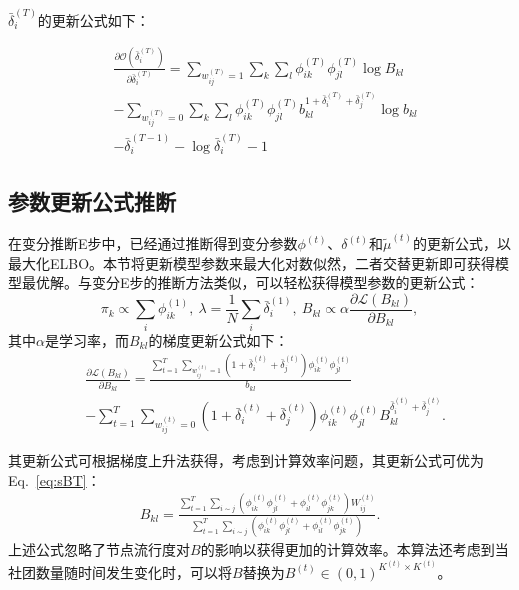 $\bar{\delta}_i^{(T)}$的更新公式如下：



\begin{equation}
\begin{split}
& \frac{\partial \mathscr{O}(\bar{\delta}_i^{(T)})}{\partial \bar{\delta}_i^{(T)}}  = \sum_{w_{ij}^{(T)}=1} \sum_k \sum_l \phi_{ik}^{(T)}\phi_{jl}^{(T)} \log B_{kl} \\
& -\sum_{w_{ij}^{(T)}=0} \sum_k \sum_l \phi_{ik}^{(T)}\phi_{jl}^{(T)}  b_{kl}^{1+\bar{\delta}_i^{(T)}+\bar{\delta}_j^{(T)}} \log b_{kl} \\
&  -\bar{\delta}_i^{(T-1)} - \log \bar{\delta}_i^{(T)} -1
\end{split}
\label{eq:deltaT}
\end{equation}

\subsection{参数更新公式推断}
在变分推断E步中，已经通过推断得到变分参数$\phi^{(t)}$、$\delta^{(t)}$和$\tilde{\mu}^{(t)}$的更新公式，以最大化ELBO。本节将更新模型参数来最大化对数似然，二者交替更新即可获得模型最优解。与变分E步的推断方法类似，可以轻松获得模型参数的更新公式：
\begin{equation}
\pi_k \propto \sum_i \phi_{ik}^{(1)},~\lambda = \frac{1}{N} \sum_i \bar{\delta}_i^{(1)},~B_{kl} \propto \alpha \frac{\partial \mathscr{L}(B_{kl})}{\partial B_{kl}},
\label{eq:pi}
\end{equation}
其中$\alpha$是学习率，而$B_{kl}$的梯度更新公式如下：
\begin{align}
& \frac{\partial \mathscr{L}(B_{kl})}{\partial B_{kl}}= \frac{\sum_{t=1}^T \sum_{w_{ij}^{(t)}=1}(1+\bar{\delta}_i^{(t)}+\bar{\delta}_j^{(t)}) \phi_{ik}^{(t)} \phi_{jl}^{(t)}}{b_{kl}}\nonumber \\
& -\sum_{t=1}^T \sum_{w_{ij}^{(t)}=0}(1+\bar{\delta}_i^{(t)}+\bar{\delta}_j^{(t)}) \phi_{ik}^{(t)} \phi_{jl}^{(t)} B_{kl}^{ \bar{\delta}_i^{(t)}+\bar{\delta}_j^{(t)}}.
\label{eq:B}
\end{align}

其更新公式可根据梯度上升法获得，考虑到计算效率问题，其更新公式可优为Eq.~\ref{eq:sBT}：
\begin{equation}
\begin{split}
{B}_{kl}= \frac{\sum_{t=1}^{T} \sum_{i \sim j} (\phi_{ik}^{(t)}\phi_{jl}^{(t)}+ \phi_{il}^{(t)}\phi_{jk}^{(t)}) W^{(t)}_{ij}}{\sum_{t=1}^{T} \sum_{i \sim j} (\phi_{ik}^{(t)}\phi_{jl}^{(t)}+ \phi_{il}^{(t)}\phi_{jk}^{(t)}) }.
\end{split}
\label{eq:sBT}
\end{equation}
上述公式忽略了节点流行度对$B$的影响以获得更加的计算效率。本算法还考虑到当社团数量随时间发生变化时，可以将$B$替换为$B^{(t)} \in (0, 1)^{K^{(t)} \times K^{(t)}}$。

